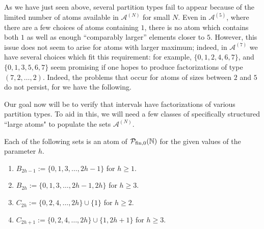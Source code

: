 
As we have just seen above, several partition types fail to appear because of the limited number of atoms available in $\mathcal{A}^{(N)}$ for small $N$.
Even in $\mathcal{A}^{(5)}$, where there are a few choices of atoms containing $1$, there is no atom which contains both $1$ as well as enough ``comparably larger'' elements closer to $5$.
However, this issue does not seem to arise for atoms with larger maximum; indeed, in $\mathcal{A}^{(7)}$ we have several choices which fit this requirement: for example, $\{0, 1, 2, 4, 6, 7\}$, and $\{0, 1, 3, 5, 6, 7\}$ seem promising if one hopes to produce factorizations of type $(7,2,\dots, 2)$. 
Indeed, the problems that occur for atoms of sizes between $2$ and $5$ do not persist, for we have the following.

Our goal now will be to verify that intervals have factorizations of various partition types.  
To aid in this, we will need a few classes of specifically structured ``large atoms" to populate the sets $\mathcal{A}^{(N)}$.

\begin{prop} \label{prop:2-congruence atoms}
	Each of the following sets is an atom of ${\mathcal{P}_{\textrm{fin},0}(\mathbb{N})}$ for the given values of the parameter $h$.
	\begin{enumerate}[label={\rm (\roman{*})}]
		\item $B_{2h-1} := \{0,1,3,\dots, 2h-1\}$ for $h\ge 1$.
		\item $B_{2h} := \{0,1,3,\dots, 2h-1,2h\}$ for $h \ge 3$.
		\item $C_{2h} := \{0,2,4,\dots,2h\}\cup\{1\}$ for $h\ge 2$.
		\item $C_{2h+1} := \{0,2,4,\dots, 2h\}\cup\{1,2h+1\}$ for $h\ge 3$.
	\end{enumerate}
\end{prop}

